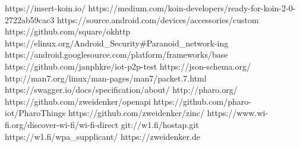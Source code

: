 \documentclass[12pt,a4paper]{article}
\begin{document}
\begin{thebibliography}{10}
		https://insert-koin.io/
		https://medium.com/koin-developers/ready-for-koin-2-0-2722ab59cac3
        https://source.android.com/devices/accessories/custom
        https://github.com/square/okhttp
        https://elinux.org/Android\_Security\#Paranoid\_network-ing
        https://android.googlesource.com/platform/frameworks/base
        https://github.com/janphkre/iot-p2p-test
        https://json-schema.org/
        http://man7.org/linux/man-pages/man7/packet.7.html
        https://swagger.io/docs/specification/about/
        http://pharo.org/
        https://github.com/zweidenker/openapi
        https://github.com/pharo-iot/PharoThings
        https://github.com/zweidenker/zinc/
        https://www.wi-fi.org/discover-wi-fi/wi-fi-direct                        		git://w1.fi/hostap.git
        https://w1.fi/wpa\_supplicant/
        https://zweidenker.de
    \end{thebibliography}
\end{document}

